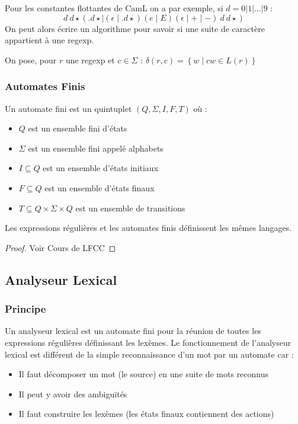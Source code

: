 \documentclass{cours}
\begin{document}
Pour les constantes flottantes de CamL on a par exemple, si $d = 0 | 1 | \ldots | 9$ :
\[
    d\ d\star(.d\star \mid (\epsilon \mid .d\star)(e \mid E)(\epsilon \mid + \mid -)\ d\ d\star)  
\]
On peut alors écrire un algorithme pour savoir si une suite de caractère appartient à une regexp.
\begin{definition}
    On pose, pour $r$ une regexp et $c \in \Sigma$ : $\delta(r, c) = \left\{w \mid cw \in L(r)\right\}$
\end{definition}

\subsubsection{Automates Finis}
\begin{definition}[Syntaxe]
    Un automate fini est un quintuplet $(Q, \Sigma, I, F, T)$ où :
    \begin{itemize}
        \item $Q$ est un ensemble fini d'états
        \item $\Sigma$ est un ensemble fini appelé alphabets
        \item $I \subseteq Q$ est un ensemble d'états initiaux
        \item $F \subseteq Q$ est un ensemble d'états finaux
        \item $T \subseteq Q \times \Sigma \times Q$ est un ensemble de transitions
    \end{itemize}
\end{definition}

\begin{theorem}[De Kleene]
    Les expressions régulières et les automates finis définissent les mêmes langages. 
\end{theorem}
\begin{proof}
    Voir Cours de LFCC
\end{proof}

\subsection{Analyseur Lexical}

\subsubsection{Principe}

Un analyseur lexical est un automate fini pour la réunion de toutes les expressions régulières définissant les lexèmes.
Le fonctionnement de l'analyseur lexical est différent de la simple reconnaissance d'un mot par un automate car : 
\begin{itemize}
    \item Il faut décomposer un mot (le source) en une suite de mots reconnus
    \item Il peut y avoir des ambiguïtés
    \item Il faut construire les lexèmes (les états finaux contiennent des actions)
\end{itemize}
\end{document}
